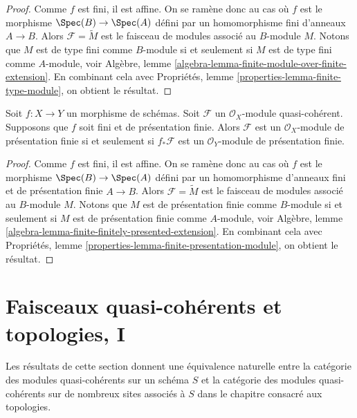\begin{proof}
Comme $f$ est fini, il est affine. On se ramène donc au cas où
$f$ est le morphisme $\Spec(B) \to \Spec(A)$ défini
par un homomorphisme fini d'anneaux $A \to B$.
Alors $\mathcal{F} = \widetilde{M}$ est le faisceau de modules
associé au $B$-module $M$.
Notons que $M$ est de type fini comme $B$-module si et seulement si
$M$ est de type fini comme $A$-module, voir
Algèbre, lemme \ref{algebra-lemma-finite-module-over-finite-extension}.
En combinant cela avec
Propriétés, lemme \ref{properties-lemma-finite-type-module},
on obtient le résultat.
\end{proof}

\begin{lemma}
\label{lemma-finite-finitely-presented-module}
Soit $f : X \to Y$ un morphisme de schémas.
Soit $\mathcal{F}$ un $\mathcal{O}_X$-module quasi-cohérent.
Supposons que $f$ soit fini et de présentation finie.
Alors $\mathcal{F}$ est un $\mathcal{O}_X$-module de présentation finie
si et seulement si $f_*\mathcal{F}$ est un $\mathcal{O}_Y$-module de présentation
finie.
\end{lemma}

\begin{proof}
Comme $f$ est fini, il est affine. On se ramène donc au cas où
$f$ est le morphisme $\Spec(B) \to \Spec(A)$ défini
par un homomorphisme d'anneaux fini et de présentation finie $A \to B$.
Alors $\mathcal{F} = \widetilde{M}$ est le faisceau de modules
associé au $B$-module $M$.
Notons que $M$ est de présentation finie comme $B$-module si et seulement si
$M$ est de présentation finie comme $A$-module, voir
Algèbre, lemme \ref{algebra-lemma-finite-finitely-presented-extension}.
En combinant cela avec
Propriétés, lemme \ref{properties-lemma-finite-presentation-module},
on obtient le résultat.
\end{proof}
















\section{Faisceaux quasi-cohérents et topologies, I}
\label{section-quasi-coherent-sheaves}

\noindent
Les résultats de cette section donnent une équivalence naturelle entre
la catégorie des modules quasi-cohérents sur un schéma $S$ et la catégorie
des modules quasi-cohérents sur de nombreux sites associés à $S$
dans le chapitre consacré aux topologies.

